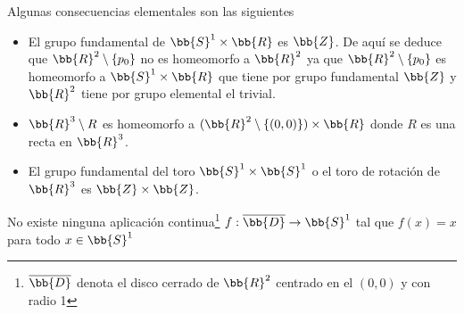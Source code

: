 \begin{observacion}
    Algunas consecuencias elementales son las siguientes
    \begin{itemize}
        \item El grupo fundamental de $\bb{S}^1\times \bb{R}$ es $\bb{Z}$. De aquí se deduce que $\bb{R}^2 \setminus \{p_0\}$ no es homeomorfo a $\bb{R}^2$ ya que $\bb{R}^2 \setminus \{p_0\}$ es homeomorfo a $\bb{S}^1\times \bb{R}$ que tiene por grupo fundamental $\bb{Z}$ y $\bb{R}^2$ tiene por grupo elemental el trivial.
        
        \item $\bb{R}^3\setminus R$ es homeomorfo a $(\bb{R}^2 \setminus \{(0,0)\}) \times \bb{R}$ donde $R$ es una recta en $\bb{R}^3$.
        
        \item El grupo fundamental del toro $\bb{S}^1 \times \bb{S}^1$ o el toro de rotación de $\bb{R}^3$ es $\bb{Z}\times \bb{Z}$.
    \end{itemize}
\end{observacion}

\begin{prop}
    No existe ninguna aplicación continua\footnote{$\overline{\bb{D}}$ denota el disco cerrado de $\bb{R}^2$ centrado en el $(0,0)$ y con radio 1} $f : \overline{\bb{D}} \to \bb{S}^1$ tal que $f(x) = x$ para todo $x\in \bb{S}^1$
\end{prop}

